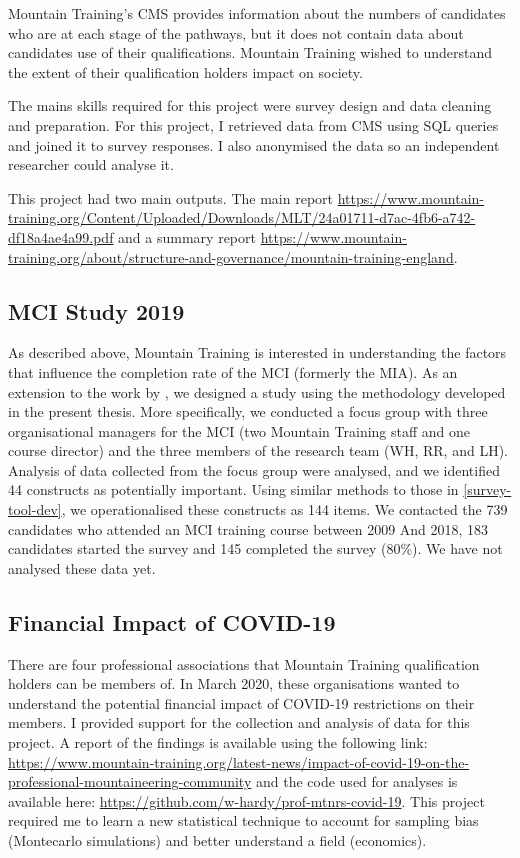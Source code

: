 \documentclass[
  12pt,
  a4paper,
]{book}
\begin{document}
Mountain Training's CMS provides information about the numbers of candidates who are at each stage of the pathways, but it does not contain data about candidates use of their qualifications. Mountain Training wished to understand the extent of their qualification holders impact on society.

The mains skills required for this project were survey design and data cleaning and preparation. For this project, I retrieved data from CMS using SQL queries and joined it to survey responses. I also anonymised the data so an independent researcher could analyse it.

This project had two main outputs. The main report \citep{MTE2019} \url{https://www.mountain-training.org/Content/Uploaded/Downloads/MLT/24a01711-d7ac-4fb6-a742-df18a4ae4a99.pdf} and a summary report \citep{MTE2019b} \url{https://www.mountain-training.org/about/structure-and-governance/mountain-training-england}.

\hypertarget{mci-study-2019}{%
\subsection{MCI Study 2019}\label{mci-study-2019}}

As described above, Mountain Training is interested in understanding the factors that influence the completion rate of the MCI (formerly the MIA). As an extension to the work by \citet{Hardy2017b}, we designed a study using the methodology developed in the present thesis. More specifically, we conducted a focus group with three organisational managers for the MCI (two Mountain Training staff and one course director) and the three members of the research team (WH, RR, and LH). Analysis of data collected from the focus group were analysed, and we identified 44 constructs as potentially important. Using similar methods to those in \ref{survey-tool-dev}, we operationalised these constructs as 144 items. We contacted the 739 candidates who attended an MCI training course between 2009 And 2018, 183 candidates started the survey and 145 completed the survey (80\%). We have not analysed these data yet.

\hypertarget{financial-impact-of-covid-19}{%
\subsection{Financial Impact of COVID-19}\label{financial-impact-of-covid-19}}

There are four professional associations that Mountain Training qualification holders can be members of. In March 2020, these organisations wanted to understand the potential financial impact of COVID-19 restrictions on their members. I provided support for the collection and analysis of data for this project. A report of the findings is available using the following link: \url{https://www.mountain-training.org/latest-news/impact-of-covid-19-on-the-professional-mountaineering-community} and the code used for analyses is available here: \url{https://github.com/w-hardy/prof-mtnrs-covid-19}. This project required me to learn a new statistical technique to account for sampling bias (Montecarlo simulations) and better understand a field (economics).
\end{document}
